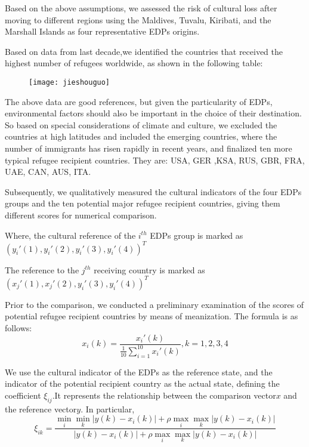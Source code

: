 \documentclass{mcmthesis}
\newcommand{\upcite}[1]{\textsuperscript{\textsuperscript{\cite{#1}}}}
\begin{document}
Based on the above assumptions, we assessed the risk of cultural loss after moving to different regions  using the Maldives, Tuvalu, Kiribati, and the Marshall Islands as four representative EDPs origins.  

Based on data from last decade\upcite{2},we identified the countries that received the highest number of refugees worldwide, as shown in the following table:
\begin{figure}[h]%
	\small
	\centering
	\texttt{[image: jieshouguo]}%
\end{figure}

The above data are good references, but given the particularity of EDPs, environmental factors should also be important in the choice of their destination. So based on special considerations of climate and culture, we excluded the countries at high latitudes and included the emerging countries, where the number of immigrants has risen rapidly in recent years, and finalized ten more typical refugee recipient countries. They are: USA, GER ,KSA, RUS, GBR, FRA, UAE, CAN, AUS, ITA. 

Subsequently, we qualitatively measured the cultural indicators of the four EDPs groups and the ten potential major refugee recipient countries, giving them different scores for numerical comparison. 

Where, the cultural reference of the $i^{th}$ EDPs group is marked as$(y_{i}'(1),y_{i}'(2),y_{i}'(3),y_{i}'(4))^T$

The reference to the $j^{th}$ receiving country is marked as$(x_{j}'(1),x_{j}'(2),y_{i}'(3),y_{i}'(4))^T$

Prior to the comparison, we conducted a preliminary examination of the scores of potential refugee recipient countries by means of meanization. The formula is as follows:
\begin{equation}%
x_{i}(k)=\dfrac{x_{i}'(k)}{\frac{1}{10}\sum_{i=1}^{10}x_{i}'(k)},k=1,2,3,4 
\end{equation}

We use the cultural indicator of the EDPs as the reference state, and the indicator of the potential recipient country as the actual state, defining the coefficient $ \xi_{ij} $.It represents the relationship between the comparison vector$ x $ and the reference vector$ y $.  In particular, 
\begin{equation}
\xi_{ik}=\dfrac{\min\limits_i\min\limits_k\vert{y(k)-x_{i}(k)}\vert+\rho\max\limits_i\max\limits_k\vert{y(k)-x_{i}(k)}\vert}{{\vert}y(k)-x_{i}(k)\vert+\rho\max\limits_i\max\limits_k\vert{y(k)-x_{i}(k)}\vert}
\end{equation}
\end{document}
